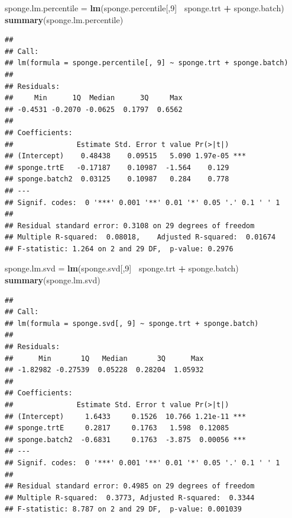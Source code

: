 \documentclass[]{book}
\newenvironment{Shaded}{\begin{snugshade}}{\end{snugshade}}
\newcommand{\KeywordTok}[1]{\textcolor[rgb]{0.13,0.29,0.53}{\textbf{#1}}}
\newcommand{\DecValTok}[1]{\textcolor[rgb]{0.00,0.00,0.81}{#1}}
\newcommand{\StringTok}[1]{\textcolor[rgb]{0.31,0.60,0.02}{#1}}
\newcommand{\OperatorTok}[1]{\textcolor[rgb]{0.81,0.36,0.00}{\textbf{#1}}}
\newcommand{\NormalTok}[1]{#1}
\begin{document}
\begin{Shaded}
\begin{Highlighting}[]
\NormalTok{sponge.lm.percentile =}\StringTok{ }\KeywordTok{lm}\NormalTok{(sponge.percentile[,}\DecValTok{9}\NormalTok{]}\OperatorTok{~}\StringTok{ }\NormalTok{sponge.trt }\OperatorTok{+}\StringTok{ }\NormalTok{sponge.batch)}
\KeywordTok{summary}\NormalTok{(sponge.lm.percentile)}
\end{Highlighting}
\end{Shaded}

\begin{verbatim}
## 
## Call:
## lm(formula = sponge.percentile[, 9] ~ sponge.trt + sponge.batch)
## 
## Residuals:
##     Min      1Q  Median      3Q     Max 
## -0.4531 -0.2070 -0.0625  0.1797  0.6562 
## 
## Coefficients:
##               Estimate Std. Error t value Pr(>|t|)    
## (Intercept)    0.48438    0.09515   5.090 1.97e-05 ***
## sponge.trtE   -0.17187    0.10987  -1.564    0.129    
## sponge.batch2  0.03125    0.10987   0.284    0.778    
## ---
## Signif. codes:  0 '***' 0.001 '**' 0.01 '*' 0.05 '.' 0.1 ' ' 1
## 
## Residual standard error: 0.3108 on 29 degrees of freedom
## Multiple R-squared:  0.08018,    Adjusted R-squared:  0.01674 
## F-statistic: 1.264 on 2 and 29 DF,  p-value: 0.2976
\end{verbatim}

\begin{Shaded}
\begin{Highlighting}[]
\NormalTok{sponge.lm.svd =}\StringTok{ }\KeywordTok{lm}\NormalTok{(sponge.svd[,}\DecValTok{9}\NormalTok{]}\OperatorTok{~}\StringTok{ }\NormalTok{sponge.trt }\OperatorTok{+}\StringTok{ }\NormalTok{sponge.batch)}
\KeywordTok{summary}\NormalTok{(sponge.lm.svd)}
\end{Highlighting}
\end{Shaded}

\begin{verbatim}
## 
## Call:
## lm(formula = sponge.svd[, 9] ~ sponge.trt + sponge.batch)
## 
## Residuals:
##      Min       1Q   Median       3Q      Max 
## -1.82982 -0.27539  0.05228  0.28204  1.05932 
## 
## Coefficients:
##               Estimate Std. Error t value Pr(>|t|)    
## (Intercept)     1.6433     0.1526  10.766 1.21e-11 ***
## sponge.trtE     0.2817     0.1763   1.598  0.12085    
## sponge.batch2  -0.6831     0.1763  -3.875  0.00056 ***
## ---
## Signif. codes:  0 '***' 0.001 '**' 0.01 '*' 0.05 '.' 0.1 ' ' 1
## 
## Residual standard error: 0.4985 on 29 degrees of freedom
## Multiple R-squared:  0.3773, Adjusted R-squared:  0.3344 
## F-statistic: 8.787 on 2 and 29 DF,  p-value: 0.001039
\end{verbatim}
\end{document}
